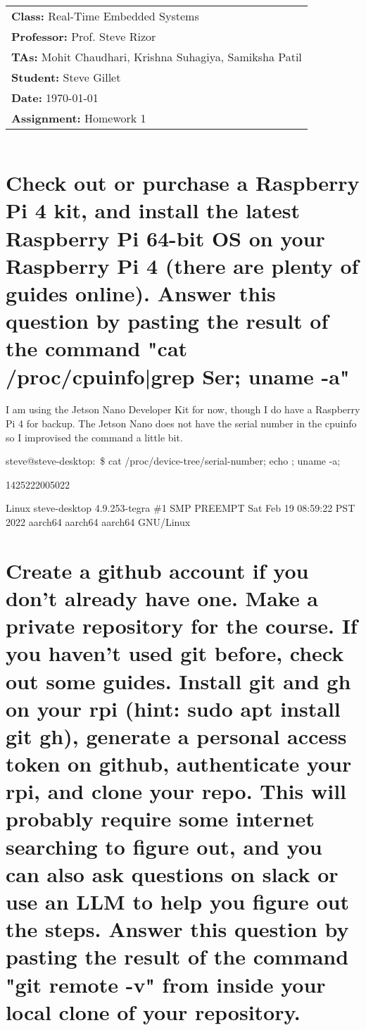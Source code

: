 \documentclass[12pt, letterpaper]{article}
\begin{document}
\title{
    \begin{tabular}{@{}l@{}}
        \textbf{Class:} Real-Time Embedded Systems \\
        \textbf{Professor:} Prof. Steve Rizor \\
        \textbf{TAs:} Mohit Chaudhari, Krishna Suhagiya, Samiksha Patil \\
        \textbf{Student:} Steve Gillet \\
        \textbf{Date:} \today \\
        \textbf{Assignment:} Homework 1
    \end{tabular}
}

\author{}
\date{}

\maketitle

\section{Check out or purchase a Raspberry Pi 4 kit, and install the latest Raspberry Pi 64-bit OS on your
Raspberry Pi 4 (there are plenty of guides online). Answer this question by pasting the result of the
command "cat /proc/cpuinfo|grep Ser; uname -a"}

I am using the Jetson Nano Developer Kit for now, though I do have a Raspberry Pi 4 for backup.
The Jetson Nano does not have the serial number in the cpuinfo so I improvised the command a little bit.

steve@steve-desktop:~\$ cat /proc/device-tree/serial-number; echo ; uname -a;

1425222005022

Linux steve-desktop 4.9.253-tegra \#1 SMP PREEMPT Sat Feb 19 08:59:22 PST 2022 aarch64 aarch64 aarch64 GNU/Linux

\section{Create a github account if you don't already have one. Make a private repository for the course. If you
haven't used git before, check out some guides. Install git and gh on your rpi (hint: sudo apt install git
gh), generate a personal access token on github, authenticate your rpi, and clone your repo. This will
probably require some internet searching to figure out, and you can also ask questions on slack or use
an LLM to help you figure out the steps. Answer this question by pasting the result of the command
"git remote -v" from inside your local clone of your repository.}
\end{document}
